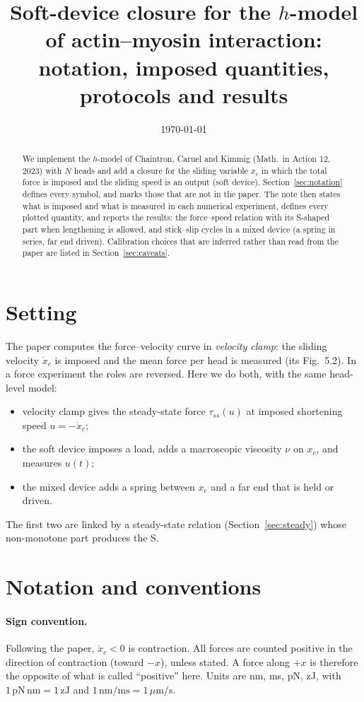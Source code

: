 \documentclass[11pt,a4paper]{article}
\title{Soft-device closure for the $h$-model of actin--myosin interaction:\\
notation, imposed quantities, protocols and results}
\author{}
\date{\today}
\begin{document}
\maketitle

\begin{abstract}
\noindent
We implement the $h$-model of Chaintron, Caruel and Kimmig (Math.\ in Action 12, 2023) with $N$ heads and add a closure for the sliding variable $x_c$ in which the total force is imposed and the sliding speed is an output (soft device). Section~\ref{sec:notation} defines every symbol, and marks those that are not in the paper. The note then states what is imposed and what is measured in each numerical experiment, defines every plotted quantity, and reports the results: the force--speed relation with its S-shaped part when lengthening is allowed, and stick--slip cycles in a mixed device (a spring in series, far end driven). Calibration choices that are inferred rather than read from the paper are listed in Section~\ref{sec:caveats}.
\end{abstract}

\section{Setting}

The paper computes the force--velocity curve in \emph{velocity clamp}: the sliding velocity $\dot x_c$ is imposed and the mean force per head is measured (its Fig.~5.2). In a force experiment the roles are reversed. Here we do both, with the same head-level model:
\begin{itemize}
\item velocity clamp gives the steady-state force $\tau_{ss}(u)$ at imposed shortening speed $u=-\dot x_c$;
\item the soft device imposes a load, adds a macroscopic viscosity $\nu$ on $x_c$, and measures $u(t)$;
\item the mixed device adds a spring between $x_c$ and a far end that is held or driven.
\end{itemize}
The first two are linked by a steady-state relation (Section~\ref{sec:steady}) whose non-monotone part produces the S.

\section{Notation and conventions}
\label{sec:notation}

\paragraph{Sign convention.} Following the paper, $\dot x_c<0$ is contraction. All forces are counted positive in the direction of contraction (toward $-x$), unless stated. A force along $+x$ is therefore the opposite of what is called ``positive'' here. Units are nm, ms, pN, zJ, with $1\,\mathrm{pN\,nm}=1\,\mathrm{zJ}$ and $1\,\mathrm{nm/ms}=1\,\mu\mathrm{m/s}$.
\end{document}
